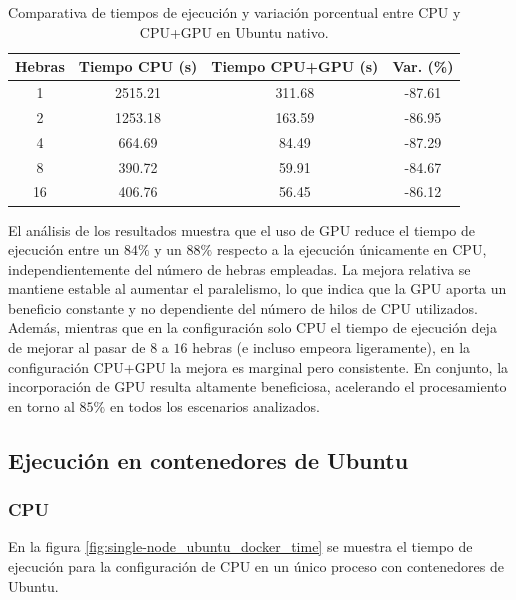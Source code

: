 \begin{table}[ht]
    \centering
    \begin{tabular}{|c|c|c|c|}
        \hline
        \textbf{Hebras} & \textbf{Tiempo CPU (s)} & \textbf{Tiempo CPU+GPU (s)} & \textbf{Var. (\%)} \\
        \hline
        1               & 2515.21                 & 311.68                      & -87.61             \\
        2               & 1253.18                 & 163.59                      & -86.95             \\
        4               & 664.69                  & 84.49                       & -87.29             \\
        8               & 390.72                  & 59.91                       & -84.67             \\
        16              & 406.76                  & 56.45                       & -86.12             \\
        \hline
    \end{tabular}
    \caption{Comparativa de tiempos de ejecución y variación porcentual entre CPU y CPU+GPU en Ubuntu nativo.}
    \label{tab:single-node_ubuntu_cpu_vs_gpu_native}
\end{table}

El análisis de los resultados muestra que el uso de GPU reduce el tiempo de ejecución entre un $84\%$ y un $88\%$ respecto a la ejecución únicamente en CPU, independientemente del número de hebras empleadas. La mejora relativa se mantiene estable al aumentar el paralelismo, lo que indica que la GPU aporta un beneficio constante y no dependiente del número de hilos de CPU utilizados. Además, mientras que en la configuración solo CPU el tiempo de ejecución deja de mejorar al pasar de $8$ a $16$ hebras (e incluso empeora ligeramente), en la configuración CPU+GPU la mejora es marginal pero consistente. En conjunto, la incorporación de GPU resulta altamente beneficiosa, acelerando el procesamiento en torno al $85\%$ en todos los escenarios analizados.

\subsection{Ejecución en contenedores de Ubuntu}
\subsubsection{CPU}

En la figura \ref{fig:single-node_ubuntu_docker_time} se muestra el tiempo de ejecución para la configuración de CPU en un único proceso con contenedores de Ubuntu.

